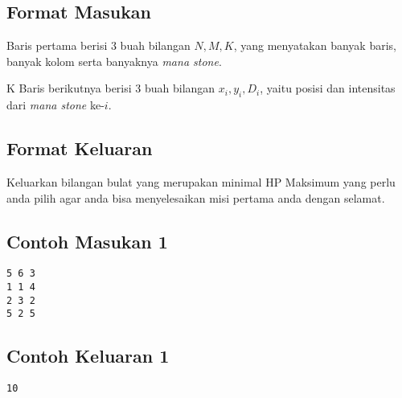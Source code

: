 \documentclass{article}
\begin{document}
\subsection*{Format Masukan}

Baris pertama berisi 3 buah bilangan $N, M, K$, yang menyatakan banyak baris, banyak kolom serta banyaknya \textit{mana stone}. 

K Baris berikutnya berisi 3 buah bilangan $x_i, y_i, D_i$, yaitu posisi dan intensitas dari \textit{mana stone} ke-$i$.

\subsection*{Format Keluaran}
Keluarkan bilangan bulat yang merupakan minimal HP Maksimum yang perlu anda pilih agar anda bisa menyelesaikan misi pertama anda dengan selamat.


\begin{multicols}{2}
\subsection*{Contoh Masukan 1}
\begin{lstlisting}
5 6 3
1 1 4
2 3 2
5 2 5
\end{lstlisting}
\columnbreak
\subsection*{Contoh Keluaran 1}
\begin{lstlisting}
10
\end{lstlisting}
\vfill
\null
\end{multicols}
\end{document}

